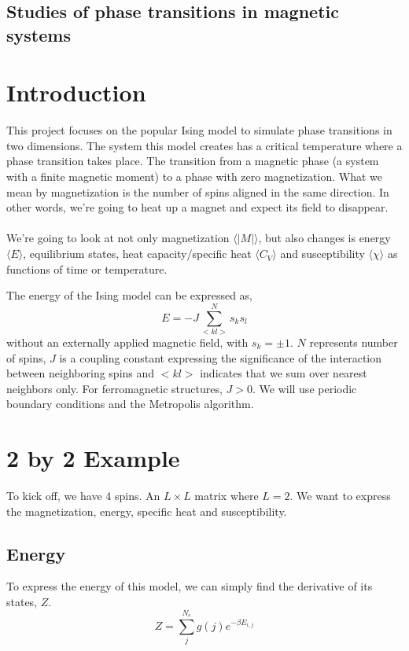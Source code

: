 \documentclass[%
oneside,                 %
final,                   %
10pt]{article}
\begin{document}
\subsection*{Studies of phase transitions in magnetic systems}

\section*{Introduction}
This project focuses on the popular Ising model to simulate phase transitions in two dimensions. The system this model creates has a critical temperature where a 
phase transition takes place. The transition from a magnetic phase (a system with a finite magnetic moment) to a phase with zero magnetization. What we mean by magnetization is the number of spins aligned in the same direction.
In other words, we're going to heat up a magnet and expect its field to disappear.
\\
\\
We're going to look at not only magnetization $\langle|M|\rangle$, but also changes is energy $\langle E\rangle$, equilibrium states, heat capacity/specific heat $\langle C_V\rangle$ and susceptibility $\langle \chi \rangle$ as functions of time or temperature.

The energy of the Ising model can be expressed as,
\[
E=-J\sum_{< kl >}^{N}s_ks_l 
\]
without an externally applied magnetic field, 
with
$s_k=\pm 1$. $N$ represents number of spins, $J$ is a coupling
constant expressing the significance of the interaction between
neighboring spins and $<kl>$ indicates that we sum over
nearest neighbors only. For ferromagnetic structures, $J> 0$.  We will use periodic boundary conditions and
the Metropolis algorithm. 

\section*{2 by 2 Example}

To kick off, we have 4 spins. An $L\times L$ matrix where $L=2$. We want to express the magnetization, energy, specific heat and susceptibility.
\subsection*{Energy}
To express the energy of this model, we can simply find the derivative of its states, $Z$.
\begin{equation}
 \label{Z}
 Z = \sum_{j}^{N_e} g(j)e^{-\beta E_{i,j}}
\end{equation}
\end{document}
